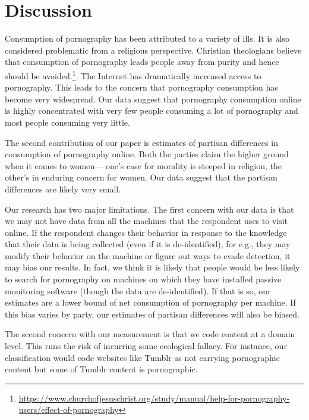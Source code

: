 \documentclass[12pt, letterpaper]{article}
\begin{document}
\section*{Discussion}

Consumption of pornography has been attributed to a variety of ills. It is also considered problematic from a religious perspective. Christian theologians believe that consumption of pornography leads people away from purity and hence should be avoided.\footnote{\url{https://www.churchofjesuschrist.org/study/manual/help-for-pornography-users/effect-of-pornography}}. The Internet has dramatically increased access to pornography. This leads to the concern that pornography consumption has become very widespread. Our data suggest that pornography consumption online is highly concentrated with very few people consuming a lot of pornography and most people consuming very little.

The second contribution of our paper is estimates of partisan differences in consumption of pornography online. Both the parties claim the higher ground when it comes to women--- one's case for morality is steeped in religion, the other's in enduring concern for women. Our data suggest that the partisan differences are likely very small.

Our research has two major limitations. The first concern with our data is that we may not have data from all the machines that the respondent uses to visit online. If the respondent changes their behavior in response to the knowledge that their data is being collected (even if it is de-identified), for e.g., they may modify their behavior on the machine or figure out ways to evade detection, it may bias our results. In fact, we think it is likely that people would be less likely to search for pornography on machines on which they have installed passive monitoring software (though the data are de-identified). If that is so, our estimates are a lower bound of net consumption of pornography per machine. If this bias varies by party, our estimates of partisan differences will also be biased. 

The second concern with our measurement is that we code content at a domain level. This runs the risk of incurring some ecological fallacy. For instance, our classification would code websites like Tumblr as not carrying pornographic content but some of Tumblr content is pornographic. 

\clearpage


\clearpage
\end{document}
